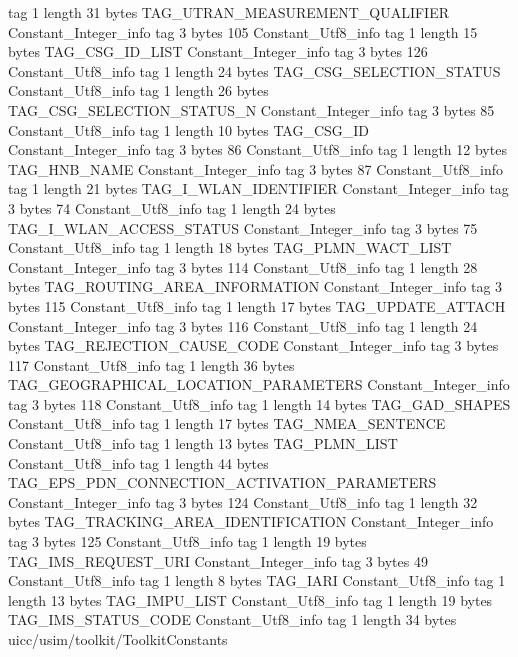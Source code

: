 {{{			tag	1
			length	31
			bytes	TAG_UTRAN_MEASUREMENT_QUALIFIER
		}
		Constant_Integer_info {
			tag	3
			bytes	105
		}
		Constant_Utf8_info {
			tag	1
			length	15
			bytes	TAG_CSG_ID_LIST
		}
		Constant_Integer_info {
			tag	3
			bytes	126
		}
		Constant_Utf8_info {
			tag	1
			length	24
			bytes	TAG_CSG_SELECTION_STATUS
		}
		Constant_Utf8_info {
			tag	1
			length	26
			bytes	TAG_CSG_SELECTION_STATUS_N
		}
		Constant_Integer_info {
			tag	3
			bytes	85
		}
		Constant_Utf8_info {
			tag	1
			length	10
			bytes	TAG_CSG_ID
		}
		Constant_Integer_info {
			tag	3
			bytes	86
		}
		Constant_Utf8_info {
			tag	1
			length	12
			bytes	TAG_HNB_NAME
		}
		Constant_Integer_info {
			tag	3
			bytes	87
		}
		Constant_Utf8_info {
			tag	1
			length	21
			bytes	TAG_I_WLAN_IDENTIFIER
		}
		Constant_Integer_info {
			tag	3
			bytes	74
		}
		Constant_Utf8_info {
			tag	1
			length	24
			bytes	TAG_I_WLAN_ACCESS_STATUS
		}
		Constant_Integer_info {
			tag	3
			bytes	75
		}
		Constant_Utf8_info {
			tag	1
			length	18
			bytes	TAG_PLMN_WACT_LIST
		}
		Constant_Integer_info {
			tag	3
			bytes	114
		}
		Constant_Utf8_info {
			tag	1
			length	28
			bytes	TAG_ROUTING_AREA_INFORMATION
		}
		Constant_Integer_info {
			tag	3
			bytes	115
		}
		Constant_Utf8_info {
			tag	1
			length	17
			bytes	TAG_UPDATE_ATTACH
		}
		Constant_Integer_info {
			tag	3
			bytes	116
		}
		Constant_Utf8_info {
			tag	1
			length	24
			bytes	TAG_REJECTION_CAUSE_CODE
		}
		Constant_Integer_info {
			tag	3
			bytes	117
		}
		Constant_Utf8_info {
			tag	1
			length	36
			bytes	TAG_GEOGRAPHICAL_LOCATION_PARAMETERS
		}
		Constant_Integer_info {
			tag	3
			bytes	118
		}
		Constant_Utf8_info {
			tag	1
			length	14
			bytes	TAG_GAD_SHAPES
		}
		Constant_Utf8_info {
			tag	1
			length	17
			bytes	TAG_NMEA_SENTENCE
		}
		Constant_Utf8_info {
			tag	1
			length	13
			bytes	TAG_PLMN_LIST
		}
		Constant_Utf8_info {
			tag	1
			length	44
			bytes	TAG_EPS_PDN_CONNECTION_ACTIVATION_PARAMETERS
		}
		Constant_Integer_info {
			tag	3
			bytes	124
		}
		Constant_Utf8_info {
			tag	1
			length	32
			bytes	TAG_TRACKING_AREA_IDENTIFICATION
		}
		Constant_Integer_info {
			tag	3
			bytes	125
		}
		Constant_Utf8_info {
			tag	1
			length	19
			bytes	TAG_IMS_REQUEST_URI
		}
		Constant_Integer_info {
			tag	3
			bytes	49
		}
		Constant_Utf8_info {
			tag	1
			length	8
			bytes	TAG_IARI
		}
		Constant_Utf8_info {
			tag	1
			length	13
			bytes	TAG_IMPU_LIST
		}
		Constant_Utf8_info {
			tag	1
			length	19
			bytes	TAG_IMS_STATUS_CODE
		}
		Constant_Utf8_info {
			tag	1
			length	34
			bytes	uicc/usim/toolkit/ToolkitConstants
}}}
